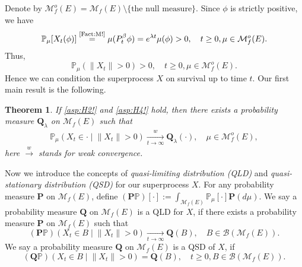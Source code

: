 \documentclass[12pt,a4paper]{amsart}
\numberwithin{equation}{section}
\theoremstyle{plain}
\newtheorem{thm}{Theorem}[section]
\theoremstyle{definition}
\theoremstyle{remark}
\begin{document}
	Denote by $\mathcal M_f^o(E) = \mathcal M_f(E)\setminus \{ \text{the null measure}\}$.
	Since $\phi$ is strictly positive, we have
\begin{equation}
	\mathbb P_\mu[X_t(\phi)]
	\overset{\text{\eqref{Fact:M!}}}= \mu(P_t^\beta \phi)
	=e^{\lambda t}\mu(\phi)>0, \quad t\geq 0, \mu \in \mathcal M_f^o(E).
\end{equation}
	Thus,
\begin{equation}  \label{lem:Nd!}
		\mathbb P_\mu(\|X_t\| > 0) > 0,\quad t\geq 0,\mu \in \mathcal M_f^o(E).
\end{equation}
	Hence we can condition the superprocess $X$ on survival up to time $t$.
	Our first main result is the following.
	
\begin{thm} \label{Theorem:Y:H1:H2:H3:H4}
	If \eqref{asp:H2!} and \eqref{asp:H4!} hold,
	then there exists a probability measure $\mathbf Q_\lambda$ on $\mathcal M_f(E)$ such that
\begin{align}
 	\mathbb P_\mu \left(X_t \in \cdot \middle| \|X_t\| > 0 \right)
\xrightarrow[t\to \infty]{w} \mathbf Q_\lambda(\cdot),
 	\quad \mu \in \mathcal M_f^o(E),
\end{align}
here $\xrightarrow{w}$ stands for weak convergence.
\end{thm}

	Now we introduce the concepts of \emph{quasi-limiting distribution (QLD)} and \emph{quasi-stationary distribution (QSD)} for our superprocess $X$.
	For any probability measure $\mathbf P$ on $\mathcal M_f(E)$, define $(\mathbf P\mathbb P)[\cdot] := \int_{\mathcal M_f(E)} \mathbb P_\mu[\cdot] \mathbf P(d\mu)$.
	We say a probability measure $\mathbf Q$ on $\mathcal M_f(E)$ is a QLD for $X$, if there exists a probability measure $\mathbf P$ on $\mathcal M_f(E)$ such that
	\[
	(\mathbf P\mathbb P)\left(X_t \in B \middle| \|X_t\|>0\right) \xrightarrow[t\to \infty]{} \mathbf Q(B), \quad B\in \mathcal B(\mathcal M_f(E)).
	\]
	We say a probability measure $\mathbf Q$ on $\mathcal M_f(E)$ is a QSD of $X$, if
	\[
	(\mathbf Q \mathbb P) \left( X_t \in B \middle | \|X_t\|>0 \right) = \mathbf Q(B), \quad t\geq 0, B \in \mathcal B(\mathcal M_f(E)).
	\]
	
\end{document}
